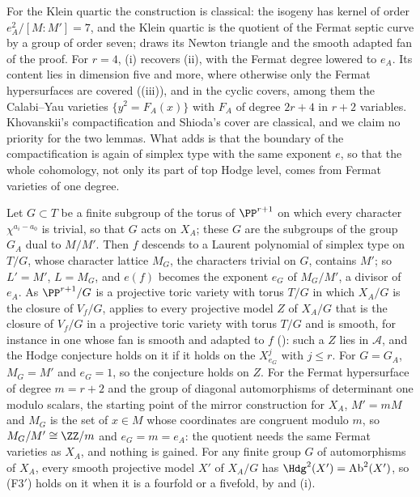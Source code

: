 For the Klein quartic the construction is classical: the isogeny has kernel
of order $e_{A}^{2}/[M:M']=7$, and the Klein quartic is the quotient of the
Fermat septic curve by a group of order seven;  draws
its Newton triangle and the smooth adapted fan of the proof. For $r=4$,
(i) recovers (ii), with the Fermat
degree lowered to $e_{A}$. Its content lies in dimension five and more, where
otherwise only the Fermat hypersurfaces are covered
((iii)), and in the cyclic covers, among them the Calabi--Yau
varieties $\{y^{2}=F_{A}(x)\}$ with $F_{A}$ of degree $2r+4$ in $r+2$
variables. Khovanskii's compactification and Shioda's cover are classical, and
we claim no priority for the two lemmas. What  adds is
that the boundary of the compactification is again of simplex type with the
same exponent $e$, so that the whole cohomology, not only its part of top
Hodge level, comes from Fermat varieties of one degree.

\begin{remark}\label{rem:delsartequotient}
Let $G\subset T$ be a finite subgroup of the torus of $\PP^{r+1}$ on which
every character $\chi^{a_{i}-a_{0}}$ is trivial, so that $G$ acts on $X_{A}$;
these $G$ are the subgroups of the group $G_{A}$ dual to $M/M'$. Then $f$
descends to a Laurent polynomial of simplex type on $T/G$, whose character
lattice $M_{G}$, the characters trivial on $G$, contains $M'$; so $L'=M'$,
$L=M_{G}$, and $e(f)$ becomes the exponent $e_{G}$ of $M_{G}/M'$, a divisor of
$e_{A}$. As $\PP^{r+1}/G$ is a projective toric variety with torus $T/G$ in
which $X_{A}/G$ is the closure of $V_{f}/G$,  applies
to every projective model $Z$ of $X_{A}/G$ that is the closure of $V_{f}/G$
in a projective toric variety with torus $T/G$ and is smooth, for instance in
one whose fan is smooth and adapted to $f$ (): such a
$Z$ lies in $\mathcal{A}$, and the Hodge conjecture holds on it if it holds
on the $X^{j}_{e_{G}}$ with $j\le r$. For $G=G_{A}$, $M_{G}=M'$ and $e_{G}=1$,
so the conjecture holds on $Z$. For the Fermat hypersurface of degree
$m=r+2$ and the group of diagonal automorphisms of determinant one modulo
scalars, the starting point of the mirror construction for $X_{A}$, $M'=mM$
and $M_{G}$ is the set of $x\in M$ whose coordinates are congruent modulo
$m$, so $M_{G}/M'\cong\ZZ/m$ and $e_{G}=m=e_{A}$: the quotient needs the
same Fermat varieties as $X_{A}$, and nothing is gained. For any finite
group $G$ of automorphisms of $X_{A}$, every smooth projective model $X'$ of
$X_{A}/G$ has $\Hdg^{2}(X')=\mathrm{Ab}^{2}(X')$, so \textup{(F3$'$)} holds on
it when it is a fourfold or a fivefold, by  and
(i).
\end{remark}

